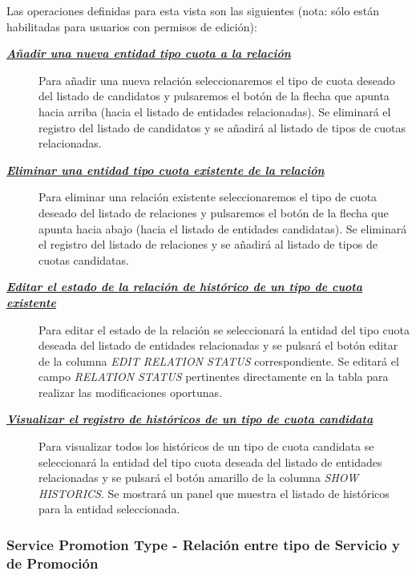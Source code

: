 Las operaciones definidas para esta vista son las siguientes (nota: sólo están habilitadas para usuarios con permisos de edición):
\begin{description}
\item[\underline{\textsl{\textbf{Añadir una nueva entidad tipo cuota a la relación}}}] Para añadir una nueva relación seleccionaremos el tipo de cuota deseado del listado de candidatos y pulsaremos el botón de la flecha que apunta hacia arriba (hacia el listado de entidades relacionadas). Se eliminará el registro del listado de candidatos y se añadirá al listado de tipos de cuotas relacionadas.

\item[\underline{\textsl{\textbf{Eliminar una entidad tipo cuota existente de la relación}}}] Para eliminar una relación existente seleccionaremos el tipo de cuota deseado del listado de relaciones y pulsaremos el botón de la flecha que apunta hacia abajo (hacia el listado de entidades candidatas). Se eliminará el registro del listado de relaciones y se añadirá al listado de tipos de cuotas candidatas.

\item[\underline{\textsl{\textbf{Editar el estado de la relación de histórico de un tipo de cuota existente}}}] Para editar el estado de la relación se seleccionará la entidad del tipo cuota deseada del listado de entidades relacionadas y se pulsará el botón editar de la columna \textit{EDIT RELATION STATUS} correspondiente. Se editará el campo \emph{RELATION STATUS}  pertinentes directamente en la tabla para realizar las modificaciones oportunas.

\item[\underline{\textsl{\textbf{Visualizar el registro de históricos de un tipo de cuota candidata}}}] Para visualizar todos los históricos de un tipo de cuota candidata se seleccionará la entidad del tipo cuota deseada del listado de entidades relacionadas y se pulsará el botón amarillo de la columna \textit{SHOW HISTORICS}. Se mostrará un panel que muestra el listado de históricos para la entidad seleccionada.
\end{description}



\subsubsection{Service Promotion Type - Relación entre tipo de Servicio y de Promoción}
\label{sub:product-promotion-type-relation}

